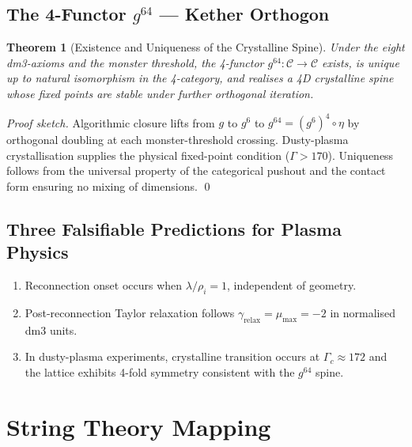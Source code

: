 \documentclass[11pt, twoside, openright]{book}
\theoremstyle{plain}
\newtheorem{theorem}{Theorem}[chapter]
\theoremstyle{definition}
\begin{document}
\section{The 4-Functor $g^{64}$ --- Kether Orthogon}

\begin{theorem}[Existence and Uniqueness of the Crystalline Spine]
Under the eight dm3-axioms and the monster threshold, the 4-functor
$g^{64} : \mathcal{C} \to \mathcal{C}$ exists, is unique up to natural
isomorphism in the 4-category, and realises a 4D crystalline spine
whose fixed points are stable under further orthogonal iteration.
\end{theorem}

\begin{proof}[Proof sketch]
Algorithmic closure lifts from $g$ to $g^6$ to $g^{64} = (g^6)^4 \circ \eta$
by orthogonal doubling at each monster-threshold crossing. Dusty-plasma
crystallisation supplies the physical fixed-point condition
($\Gamma > 170$). Uniqueness follows from the universal property of the
categorical pushout and the contact form ensuring no mixing of
dimensions. \qed
\end{proof}

\section{Three Falsifiable Predictions for Plasma Physics}

\begin{enumerate}[label=\arabic*.]
  \item Reconnection onset occurs when $\lambda/\rho_i = 1$, independent
    of geometry.
  \item Post-reconnection Taylor relaxation follows
    $\gamma_{\text{relax}} = \mu_{\max} = -2$ in normalised dm3 units.
  \item In dusty-plasma experiments, crystalline transition occurs at
    $\Gamma_c \approx 172$ and the lattice exhibits 4-fold symmetry
    consistent with the $g^{64}$ spine.
\end{enumerate}

\chapter{String Theory Mapping}
\end{document}
